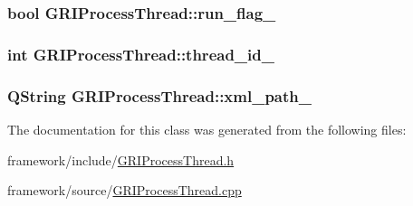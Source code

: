 \hypertarget{classGRIProcessThread_a8fb2fe6170dd07f06cfe25963398afd0}{
\subsubsection[{run\-\_\-flag\-\_\-}]{\setlength{\rightskip}{0pt plus 5cm}bool {\bf \-G\-R\-I\-Process\-Thread\-::run\-\_\-flag\-\_\-}}}\label{classGRIProcessThread_a8fb2fe6170dd07f06cfe25963398afd0}
\hypertarget{classGRIProcessThread_a35f82ee828412c8b75cdc24ba765f8ed}{
\subsubsection[{thread\-\_\-id\-\_\-}]{\setlength{\rightskip}{0pt plus 5cm}int {\bf \-G\-R\-I\-Process\-Thread\-::thread\-\_\-id\-\_\-}}}\label{classGRIProcessThread_a35f82ee828412c8b75cdc24ba765f8ed}
\hypertarget{classGRIProcessThread_a2554bf45bd5097d3074c4ae7c50e9daa}{
\subsubsection[{xml\-\_\-path\-\_\-}]{\setlength{\rightskip}{0pt plus 5cm}\-Q\-String {\bf \-G\-R\-I\-Process\-Thread\-::xml\-\_\-path\-\_\-}}}\label{classGRIProcessThread_a2554bf45bd5097d3074c4ae7c50e9daa}


\-The documentation for this class was generated from the following files\-:\begin{DoxyCompactItemize}
\item 
framework/include/\hyperlink{GRIProcessThread_8h}{\-G\-R\-I\-Process\-Thread.\-h}\item 
framework/source/\hyperlink{GRIProcessThread_8cpp}{\-G\-R\-I\-Process\-Thread.\-cpp}\end{DoxyCompactItemize}
